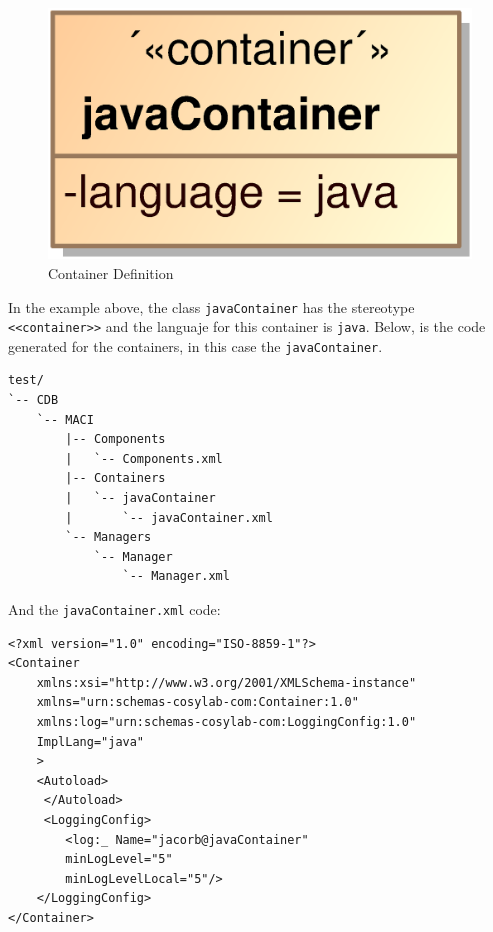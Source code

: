 \begin{figure}[h!t]
\begin{center}
\includegraphics[scale=0.18]{images/container}
\caption{\label{fig:vs_diag}Container Definition}
\end{center}
\end{figure} 

In the example above, the class \verb+javaContainer+ has the stereotype
\verb+<<container>>+ and the languaje for this container is \verb+java+.
Below, is the code generated for the containers, in this case the
\verb+javaContainer+.
\begin{center}
\begin{verbatim}
test/
`-- CDB
    `-- MACI
        |-- Components
        |   `-- Components.xml
        |-- Containers
        |   `-- javaContainer
        |       `-- javaContainer.xml
        `-- Managers
            `-- Manager
                `-- Manager.xml
\end{verbatim}
\end{center}

And the \verb+javaContainer.xml+ code:
\begin{center}
\begin{verbatim}
<?xml version="1.0" encoding="ISO-8859-1"?>
<Container 
    xmlns:xsi="http://www.w3.org/2001/XMLSchema-instance" 
    xmlns="urn:schemas-cosylab-com:Container:1.0" 
    xmlns:log="urn:schemas-cosylab-com:LoggingConfig:1.0" 
    ImplLang="java"
    >
    <Autoload>
     </Autoload>
     <LoggingConfig>
        <log:_ Name="jacorb@javaContainer" 
        minLogLevel="5" 
        minLogLevelLocal="5"/>
    </LoggingConfig>
</Container>
\end{verbatim}
\end{center}

